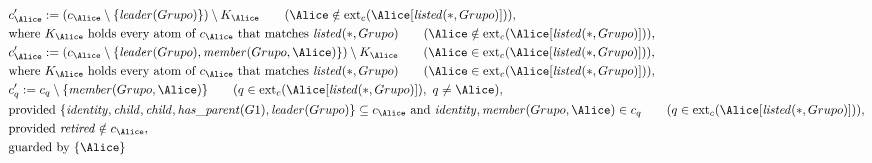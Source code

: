\begin{align*}
&
c'_
{
\Alice
}
 := 
(c_
{
\Alice
}
 \setminus 
\{
\mathit{\detokenize{
leader
}}
(
Grupo
)
\}
) \setminus K_
{
\Alice
}
 \qquad (
\Alice
 \notin 
\mathrm{ext}_c(
\Alice
[
\mathit{\detokenize{
listed
}}
(
\ast
,
Grupo
)
]
)
)
,\\
&
\text{where } K_
{
\Alice
}
 \text{ holds every atom of } c_
{
\Alice
}
 \text{ that matches } 
\mathit{\detokenize{
listed
}}
(
\ast
,
Grupo
)
 \qquad (
\Alice
 \notin 
\mathrm{ext}_c(
\Alice
[
\mathit{\detokenize{
listed
}}
(
\ast
,
Grupo
)
]
)
)
,\\
&
c'_
{
\Alice
}
 := 
(c_
{
\Alice
}
 \setminus 
\{
\mathit{\detokenize{
leader
}}
(
Grupo
)
,
\mathit{\detokenize{
member
}}
(
Grupo
,
\Alice
)
\}
) \setminus K_
{
\Alice
}
 \qquad (
\Alice
 \in 
\mathrm{ext}_c(
\Alice
[
\mathit{\detokenize{
listed
}}
(
\ast
,
Grupo
)
]
)
)
,\\
&
\text{where } K_
{
\Alice
}
 \text{ holds every atom of } c_
{
\Alice
}
 \text{ that matches } 
\mathit{\detokenize{
listed
}}
(
\ast
,
Grupo
)
 \qquad (
\Alice
 \in 
\mathrm{ext}_c(
\Alice
[
\mathit{\detokenize{
listed
}}
(
\ast
,
Grupo
)
]
)
)
,\\
&
c'_
q
 := 
c_
q
 \setminus 
\{
\mathit{\detokenize{
member
}}
(
Grupo
,
\Alice
)
\}
 \qquad (
q
 \in 
\mathrm{ext}_c(
\Alice
[
\mathit{\detokenize{
listed
}}
(
\ast
,
Grupo
)
]
)
,\ 
q \neq 
\Alice
)
,\\
&
\text{provided } 
\{
\mathit{\detokenize{
identity
}}
,
\mathit{\detokenize{
child
}}
,
\mathit{\detokenize{
child
}}
,
\mathit{\detokenize{
has_parent
}}
(
G1
)
,
\mathit{\detokenize{
leader
}}
(
Grupo
)
\}
 \subseteq c_
{
\Alice
}
 \text{ and } 
\mathit{\detokenize{
identity
}}
,
\mathit{\detokenize{
member
}}
(
Grupo
,
\Alice
)
 \in c_
q
 \qquad (
q \in 
\mathrm{ext}_c(
\Alice
[
\mathit{\detokenize{
listed
}}
(
\ast
,
Grupo
)
]
)
)
,\\
&
\text{provided } 
\mathit{\detokenize{
retired
}}
 \notin c_
{
\Alice
}
,\\
&
\text{guarded by } \{
\Alice
\}
\end{align*}


